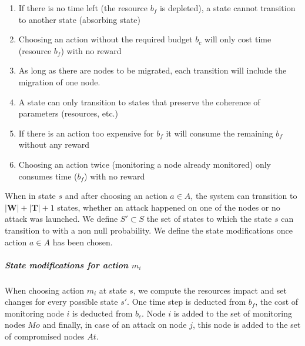 \begin{enumerate}
    \item If there is no time left (\ie the resource $b_f$ is depleted), a state cannot transition to another state (absorbing state)
    \label{cond:c1}
    \item Choosing an action without the required budget $b_c$ will only cost time (resource $b_f$) with no reward
    \label{cond:c2}
    \item As long as there are nodes to be migrated, each transition will include the migration of one node.
    \label{cond:c3}
    \item A state can only transition to states that preserve the coherence of parameters (resources, etc.)
    \label{cond:c4}
    \item If there is an action too expensive for $b_f$ it will consume the remaining $b_f$ without any reward
    \label{cond:c5}
    \item Choosing an action twice (\ie monitoring a node already monitored) only consumes time ($b_f$) with no reward
    \label{cond:c6}
 \end{enumerate}


When in state $s$ and after choosing an action $a \in A$, the system can transition to $|\textbf{W}|+|\textbf{T}| + 1 $ states, whether an attack happened on one of the nodes or no attack was launched.
We define $S' \subset S$ the set of states to which the state $s$ can transition to with a non null probability.
We define the state modifications once action $a \in A$ has been chosen.
\\
\subparagraph*{\textbf{State modifications for action $m_i$}}
When choosing action $m_i$ at state $s$, we compute the resources impact and set changes for every possible state $s'$. One time step is deducted from $b_f$, the cost of monitoring node $i$ is deducted from $b_c$. Node $i$ is added to the set of monitoring nodes $Mo$ and finally, in case of an attack on node $j$, this node is added to the set of compromised nodes $At$.

